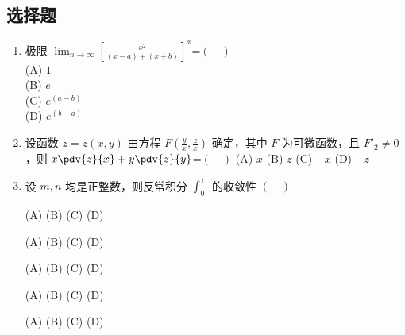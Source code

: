 
\subsection{选择题}
\begin{enumerate}
\item 极限  $\displaystyle \lim_{n\to\infty}[\frac{x^2}{(x-a)+(x+b)}]^x$=$(\quad )$\\
(A) $1$\\
(B) $e$\\
(C) $e^(a-b)$\\
(D) $e^(b-a)$
\item  设函数 $z=z(x,y)$ 由方程 $\displaystyle F(\frac{y}{x},\frac{z}{x})$ 确定，其中 $F$ 为可微函数，且 $F'_2 \neq0$ ，则  $\displaystyle x \pdv{z}{x}+y\pdv{z}{y}$=$(\quad )$
(A)  $x$
(B)  $z$
(C) $-x$
(D)  $-z$
\item 设 $m,n$ 均是正整数，则反常积分 $\int_0^1 \frac{}{}$ 的收敛性 $(\quad )$


(A) 
(B)
(C)
(D)

(A) 
(B)
(C)
(D)

(A) 
(B)
(C)
(D)

(A) 
(B)
(C)
(D)


(A) 
(B)
(C)
(D)

\end{enumerate}